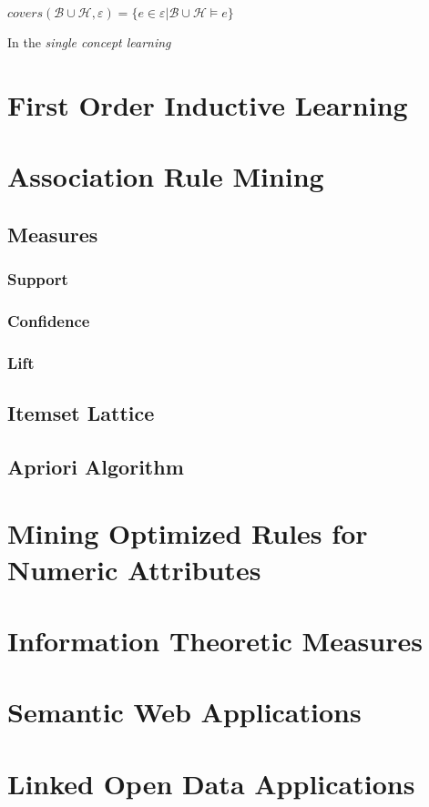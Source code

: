 \begin{center}
 $covers(\mathcal{B} \cup \mathcal{H},\varepsilon)=\{e \in \varepsilon | \mathcal{B} \cup \mathcal{H} \models e\}$
\end{center}

In the \emph{single concept learning}


\section{First Order Inductive Learning}
\section{Association Rule Mining}
\subsection{Measures}
\subsubsection{Support}
\subsubsection{Confidence}
\subsubsection{Lift}
\subsection{Itemset Lattice}
\subsection{Apriori Algorithm}

\section{Mining Optimized Rules for Numeric Attributes}

\cite{Brin99miningoptimized}

\section{Information Theoretic Measures}

\cite{DBLP:conf/sac/CaldersGPR09}

\section{Semantic Web Applications}
\section{Linked Open Data Applications}